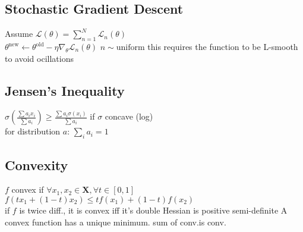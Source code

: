 \subsection*{Stochastic Gradient Descent}
Assume $\mathcal{L}(\theta){=}\sum_{n=1}^N\mathcal{L}_n(\theta)$\\
$\theta^{\mathrm{new}}{\leftarrow}\theta^{\mathrm{old}}{-}\eta\nabla_{\theta}\mathcal{L}_n(\theta)$ $n{\sim}\text{uniform}$
this requires the function to be L-smooth to avoid ocillations
\subsection*{Jensen's Inequality}
$\sigma(\frac{\sum a_ix_i}{\sum a_i}) \geq \frac{\sum a_i\sigma(x_i)}{\sum a_i}$ if $\sigma$ concave (log)\\
for distribution $a$: $\sum_ia_i=1$

\subsection*{Convexity}
$f$ convex if $\forall x_1,x_2{\in}\mathbf{X},\forall t{\in}[0,1]$\\
$ f(tx_1+(1{-}t)x_2)\leq tf(x_1)+(1{-}t)f(x_2)$\\
if $f$ is twice diff., it is convex iff it's double Hessian is positive semi-definite
A convex function has a unique minimum. sum of conv.is conv.
